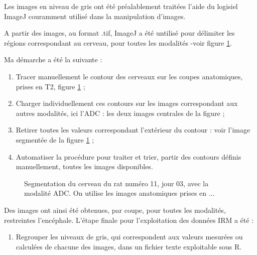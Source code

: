 Les images en niveau de gris ont été pr\'ealablement trait\'ees  l'aide du logisiel ImageJ couramment utilis\'e dans la manipulation d'images.
%
\par
A partir des images, au format .tif, %
ImageJ a \'et\'e untilis\'e pour d\'elimiter les r\'egions correspondant au cerveau, pour toutes les modalit\'es -voir figure \ref{cephcer}.
\par
Ma d\'emarche a \'et\'e la suivante :
\begin{enumerate}
\item Tracer manuellement le contour des cerveaux sur les coupes anatomiques, prises en T2, figure \ref{cephcer} ;
\item Charger individuellement ces contours sur les images correspondant aux autres modalit\'es, ici l'ADC : les deux images centrales de la figure ;
\item Retirer toutes les valeurs correspondant  l'ext\'erieur du contour : voir l'image segment\'ee de la figure \ref{cephcer} ;
\item Automatiser la proc\'edure pour traiter et trier,  partir des contours d\'efinis manuellement, toutes les images disponibles.
\end{enumerate}

\setcounter{stock}{\value{enumi}}

\begin{figure}[!h]%
\hfill
{}
\hfill
{}
\hfill
{}
\caption{Segmentation du cerveau du rat num\'ero 11, jour 03, avec la modalit\'e ADC. On utilise les images anatomiques prises en ...}%
\label{cephcer}
\end{figure}

\FloatBarrier
Des images ont ainsi \'et\'e obtenues, par coupe, pour toutes les modalit\'es, restreintes  l'enc\'ephale. L'\'etape finale pour l'exploitation des donn\'ees IRM a \'et\'e :
\begin{enumerate}
\setcounter{enumi}{\value{stock}}
\item Regrouper les niveaux de gris, qui correspondent aux valeurs mesur\'ees ou calcul\'ees de chacune des images, dans un fichier texte exploitable sous R.
\end{enumerate}

